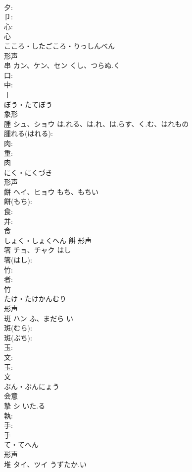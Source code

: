 \documentclass[8pt]{extreport}
\begin{document}
\begin{CJK}{UTF8}{min}
\\	夕: 
\\	卩: 
\\	心: 
\\	心	
\\	こころ・したごころ・りっしんべん	
\\	形声 
\\	串	カン、ケン、セン	くし、つらぬ.く		
\\	口: 
\\	中: 
\\	丨	
\\	ぼう・たてぼう	
\\	象形 
\\	腫	シュ、ショウ	は.れる、は.れ、は.らす、く.む、はれもの		
\\	腫れる(はれる): 
\\	肉: 
\\	重: 
\\	肉	
\\	にく・にくづき	
\\	形声 
\\	餅	ヘイ、ヒョウ	もち、もちい		
\\	餅(もち): 
\\	食: 
\\	并: 
\\	食	
\\	しょく・しょくへん	餠	形声 
\\	箸	チョ、チャク	はし		
\\	箸(はし): 
\\	竹: 
\\	者: 
\\	竹	
\\	たけ・たけかんむり	
\\	形声 
\\	斑	ハン	ふ、まだら	い	
\\	斑(むら): 
\\	斑(ぶち): 
\\	玉: 
\\	文: 
\\	玉: 
\\	文	
\\	ぶん・ぶんにょう	
\\	会意 
\\	摯	シ	いた.る		
\\	執: 
\\	手: 
\\	手	
\\	て・てへん	
\\	形声 
\\	堆	タイ、ツイ	うずたか.い		

\end{CJK}
\end{document}
